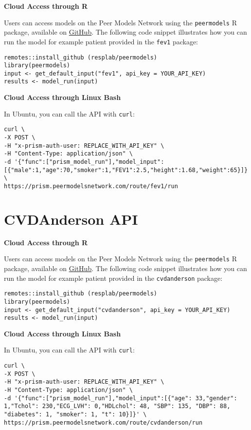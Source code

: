\documentclass[
]{book}
\begin{document}
\textbf{Cloud Access through R}

Users can access models on the Peer Models Network using the \texttt{peermodels} R package, available on \href{https://github.com/resplab/peermodels}{GitHub}. The following code snippet illustrates how you can run the model for example patient provided in the \texttt{fev1} package:

\begin{verbatim}
remotes::install_github (resplab/peermodels)
library(peermodels)
input <- get_default_input("fev1", api_key = YOUR_API_KEY)
results <- model_run(input)
\end{verbatim}

\textbf{Cloud Access through Linux Bash}

In Ubuntu, you can call the API with \texttt{curl}:

\begin{verbatim}
curl \
-X POST \
-H "x-prism-auth-user: REPLACE_WITH_API_KEY" \
-H "Content-Type: application/json" \
-d '{"func":["prism_model_run"],"model_input":[{"male":1,"age":70,"smoker":1,"FEV1":2.5,"height":1.68,"weight":65}]}' \
https://prism.peermodelsnetwork.com/route/fev1/run
\end{verbatim}

\hypertarget{cvdanderson-api}{%
\section{CVDAnderson API}\label{cvdanderson-api}}

\textbf{Cloud Access through R}

Users can access models on the Peer Models Network using the \texttt{peermodels} R package, available on \href{https://github.com/resplab/peermodels}{GitHub}. The following code snippet illustrates how you can run the model for example patient provided in the \texttt{cvdanderson} package:

\begin{verbatim}
remotes::install_github (resplab/peermodels)
library(peermodels)
input <- get_default_input("cvdanderson", api_key = YOUR_API_KEY)
results <- model_run(input)
\end{verbatim}

\textbf{Cloud Access through Linux Bash}

In Ubuntu, you can call the API with \texttt{curl}:

\begin{verbatim}
curl \
-X POST \
-H "x-prism-auth-user: REPLACE_WITH_API_KEY" \
-H "Content-Type: application/json" \
-d '{"func":["prism_model_run"],"model_input":[{"age": 33,"gender": 1,"Tchol": 230,"ECG_LVH": 0,"HDLchol": 48, "SBP": 135, "DBP": 88, "diabetes": 1, "smoker": 1, "t": 10}]}' \
https://prism.peermodelsnetwork.com/route/cvdanderson/run
\end{verbatim}
\end{document}
